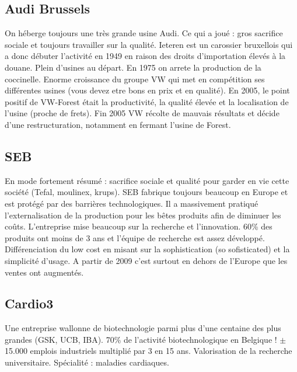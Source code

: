\subsection{Audi Brussels}
On héberge toujours une très grande usine Audi. Ce qui a joué : gros sacrifice sociale et toujours travailler sur la qualité. Ieteren est un carossier bruxellois qui a donc débuter l'activité en 1949 en raison des droits d'importation élevés à la douane. Plein d’usines au départ. En 1975 on arrete la production de la coccinelle. Enorme croissance du groupe VW qui met en compétition ses différentes usines (vous devez etre bons en prix et en qualité). En 2005, le point positif de VW-Forest était la productivité, la qualité élevée et la localisation de l'usine (proche de frets). Fin 2005 VW récolte de mauvais résultats et décide d'une restructuration, notamment en fermant l'usine de Forest.

\subsection{SEB}
En mode fortement résumé : sacrifice sociale et qualité pour garder en vie cette société (Tefal, moulinex, krups). SEB fabrique toujours beaucoup en Europe et est protégé par des barrières technologiques. Il a massivement pratiqué l’externalisation de la production pour les bêtes produits afin de diminuer les coûts. L'entreprise mise beaucoup sur la recherche et l'innovation. 60\% des produits ont moins de 3 ans et l'équipe de recherche est assez développé. Différenciation du low cost en misant sur la sophistication (so sofisticated) et la simplicité d'usage. A partir de 2009 c'est surtout en dehors de l'Europe que les ventes ont augmentés. 

\subsection{Cardio3}
Une entreprise wallonne de biotechnologie parmi plus d’une centaine des plus grandes (GSK, UCB, IBA). 70\% de l'activité biotechnologique en Belgique ! $\pm$ 15.000 emplois industriels multiplié par 3 en 15 ans. Valorisation de la recherche universitaire. Spécialité : maladies cardiaques.

